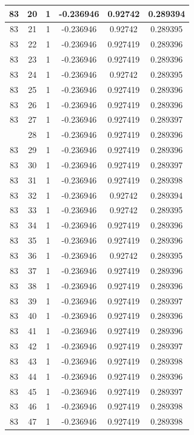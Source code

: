 \documentclass[12pt,a4paper]{article}
\numberwithin{equation}{section}
\numberwithin{figure}{section}
\numberwithin{table}{section}
\begin{document}
\begin{longtable}{|c|c|c|c|c|c|}
83 & 20 & 1 & -0.236946 & 0.92742 & 0.289394 \\ \hline
83 & 21 & 1 & -0.236946 & 0.92742 & 0.289395 \\ \hline
83 & 22 & 1 & -0.236946 & 0.927419 & 0.289396 \\ \hline
83 & 23 & 1 & -0.236946 & 0.927419 & 0.289396 \\ \hline
83 & 24 & 1 & -0.236946 & 0.92742 & 0.289395 \\ \hline
83 & 25 & 1 & -0.236946 & 0.927419 & 0.289396 \\ \hline
83 & 26 & 1 & -0.236946 & 0.927419 & 0.289396 \\ \hline
83 & 27 & 1 & -0.236946 & 0.927419 & 0.289397 \\ \hline
\pagebreak
83 & 28 & 1 & -0.236946 & 0.927419 & 0.289396 \\ \hline
83 & 29 & 1 & -0.236946 & 0.927419 & 0.289396 \\ \hline
83 & 30 & 1 & -0.236946 & 0.927419 & 0.289397 \\ \hline
83 & 31 & 1 & -0.236946 & 0.927419 & 0.289398 \\ \hline
83 & 32 & 1 & -0.236946 & 0.92742 & 0.289394 \\ \hline
83 & 33 & 1 & -0.236946 & 0.92742 & 0.289395 \\ \hline
83 & 34 & 1 & -0.236946 & 0.927419 & 0.289396 \\ \hline
83 & 35 & 1 & -0.236946 & 0.927419 & 0.289396 \\ \hline
83 & 36 & 1 & -0.236946 & 0.92742 & 0.289395 \\ \hline
83 & 37 & 1 & -0.236946 & 0.927419 & 0.289396 \\ \hline
83 & 38 & 1 & -0.236946 & 0.927419 & 0.289396 \\ \hline
83 & 39 & 1 & -0.236946 & 0.927419 & 0.289397 \\ \hline
83 & 40 & 1 & -0.236946 & 0.927419 & 0.289396 \\ \hline
83 & 41 & 1 & -0.236946 & 0.927419 & 0.289396 \\ \hline
83 & 42 & 1 & -0.236946 & 0.927419 & 0.289397 \\ \hline
83 & 43 & 1 & -0.236946 & 0.927419 & 0.289398 \\ \hline
83 & 44 & 1 & -0.236946 & 0.927419 & 0.289396 \\ \hline
83 & 45 & 1 & -0.236946 & 0.927419 & 0.289397 \\ \hline
83 & 46 & 1 & -0.236946 & 0.927419 & 0.289398 \\ \hline
83 & 47 & 1 & -0.236946 & 0.927419 & 0.289398 \\ \hline

\end{longtable}
\end{document}
